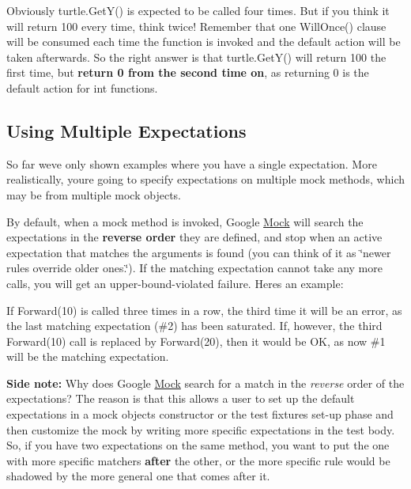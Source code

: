 Obviously {\ttfamily turtle.\+Get\+Y()} is expected to be called four times. But if you think it will return 100 every time, think twice! Remember that one {\ttfamily Will\+Once()} clause will be consumed each time the function is invoked and the default action will be taken afterwards. So the right answer is that {\ttfamily turtle.\+Get\+Y()} will return 100 the first time, but {\bfseries return 0 from the second time on}, as returning 0 is the default action for {\ttfamily int} functions.

\subsection*{Using Multiple Expectations}

So far we\textquotesingle{}ve only shown examples where you have a single expectation. More realistically, you\textquotesingle{}re going to specify expectations on multiple mock methods, which may be from multiple mock objects.

By default, when a mock method is invoked, Google \hyperlink{class_mock}{Mock} will search the expectations in the {\bfseries reverse order} they are defined, and stop when an active expectation that matches the arguments is found (you can think of it as \char`\"{}newer rules override older ones.\char`\"{}). If the matching expectation cannot take any more calls, you will get an upper-\/bound-\/violated failure. Here\textquotesingle{}s an example\+:




If {\ttfamily Forward(10)} is called three times in a row, the third time it will be an error, as the last matching expectation (\#2) has been saturated. If, however, the third {\ttfamily Forward(10)} call is replaced by {\ttfamily Forward(20)}, then it would be OK, as now \#1 will be the matching expectation.

{\bfseries Side note\+:} Why does Google \hyperlink{class_mock}{Mock} search for a match in the {\itshape reverse} order of the expectations? The reason is that this allows a user to set up the default expectations in a mock object\textquotesingle{}s constructor or the test fixture\textquotesingle{}s set-\/up phase and then customize the mock by writing more specific expectations in the test body. So, if you have two expectations on the same method, you want to put the one with more specific matchers {\bfseries after} the other, or the more specific rule would be shadowed by the more general one that comes after it.

